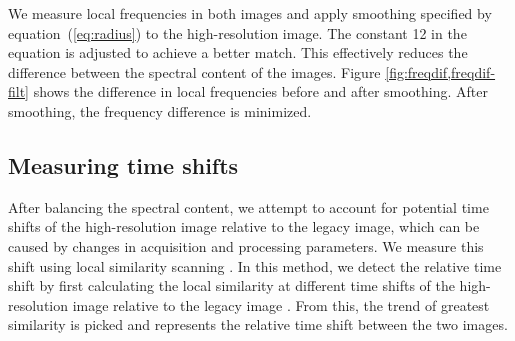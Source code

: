 We measure local frequencies in both images and apply smoothing specified by equation~(\ref{eq:radius}) to the high-resolution image. The constant 12 in the equation is adjusted to achieve a better match. This effectively reduces the difference between the spectral content of the images.
Figure \ref{fig:freqdif,freqdif-filt} shows the difference in local frequencies before and after smoothing. After smoothing, the frequency difference is minimized. %





\subsection{Measuring time shifts}

After balancing the spectral content, we attempt to account for potential time shifts of the
high-resolution image relative to the legacy image, which can be
caused by changes in acquisition and processing parameters. We measure
this shift using local similarity scanning \cite[]{attr,
  timelapse}. In this method, we detect the relative time shift by
first calculating the local similarity at different time shifts of the
high-resolution image relative to the legacy image
\cite[]{timelapse}. %
From this, the trend of greatest similarity is picked
and represents the relative time shift between the two images.

